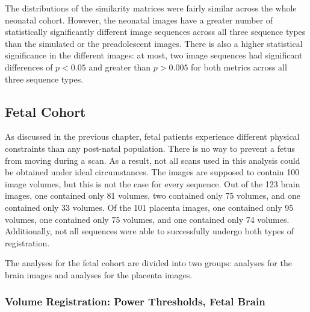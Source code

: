 The distributions of the similarity matrices were fairly similar across the whole neonatal cohort. However, the neonatal images have a greater number of statistically significantly different image sequences across all three sequence types than the simulated or the preadolescent images. There is also a higher statistical significance in the different images: at most, two image sequences had significant differences of $p < 0.05$ and greater than $p > 0.005$ for both metrics across all three sequence types.

\subsection{Fetal Cohort}

As discussed in the previous chapter, fetal patients experience different physical constraints than any post-natal population. There is no way to prevent a fetus from moving during a scan. As a result, not all scans used in this analysis could be obtained under ideal circumstances. The images are supposed to contain 100 image volumes, but this is not the case for every sequence. Out of the 123 brain images, one contained only 81 volumes, two contained only 75 volumes, and one contained only 33 volumes. Of the 101 placenta images, one contained only 95 volumes, one contained only 75 volumes, and one contained only 74 volumes. Additionally, not all sequences were able to successfully undergo both types of registration. 

The analyses for the fetal cohort are divided into two groups: analyses for the brain images and analyses for the placenta images. 

\subsubsection{Volume Registration: Power Thresholds, Fetal Brain}

